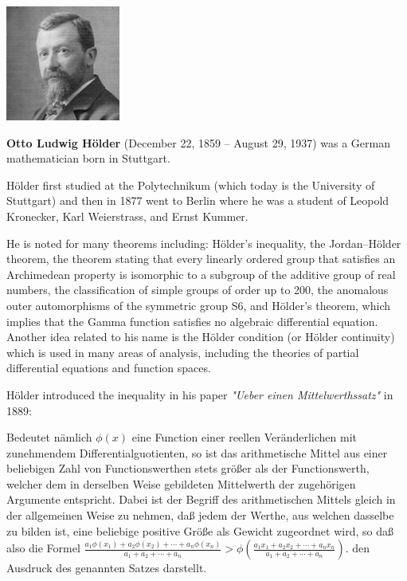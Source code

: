 \begin{qte}
    \begin{center}
        \includegraphics[height=0.3\textwidth]{Hoelder.jpg}
    \end{center}

    \textbf{Otto Ludwig Hölder} (December 22, 1859 – August 29, 1937) was a German mathematician born in Stuttgart.

Hölder first studied at the Polytechnikum (which today is the University of Stuttgart) and then in 1877 went to Berlin where he was a student of Leopold Kronecker, Karl Weierstrass, and Ernst Kummer.

He is noted for many theorems including: Hölder's inequality, the Jordan–Hölder theorem, the theorem stating that every linearly ordered group that satisfies an Archimedean property is isomorphic to a subgroup of the additive group of real numbers, the classification of simple groups of order up to 200, the anomalous outer automorphisms of the symmetric group S6, and Hölder's theorem, which implies that the Gamma function satisfies no algebraic differential equation. Another idea related to his name is the Hölder condition (or Hölder continuity) which is used in many areas of analysis, including the theories of partial differential equations and function spaces.
\end{qte}

Hölder introduced the inequality in his paper \textit{"Ueber einen Mittelwerthssatz"} in 1889:

\begin{qte}
    Bedeutet nämlich $\phi (x)$ eine Function einer reellen Veränderlichen mit zunehmendem Differentialguotienten, so ist das arithmetische Mittel aus einer beliebigen Zahl von Functionswerthen stets
größer als der Functionswerth, welcher dem in derselben Weise gebildeten Mittelwerth der zugehörigen Argumente entspricht. Dabei ist der Begriff des arithmetischen Mittels gleich in der allgemeinen Weise zu nehmen, daß jedem der Werthe, aus welchen dasselbe zu bilden ist, eine beliebige positive Größe als Gewicht zugeordnet wird, so daß also die Formel
\begin{math}
    \frac{a_1 \phi (x_1) + a_2\phi (x_2) + \cdots + a_n \phi (x_n)}{a_1 + a_2 + \cdots + a_n} > \phi (\frac{a_1 x_1 + a_2x_2 + \cdots  + a_n x_n}{a_1 + a_2 + \cdots  + a_n})
.\end{math}
den Ausdruck des genannten Satzes darstellt.
\end{qte}

